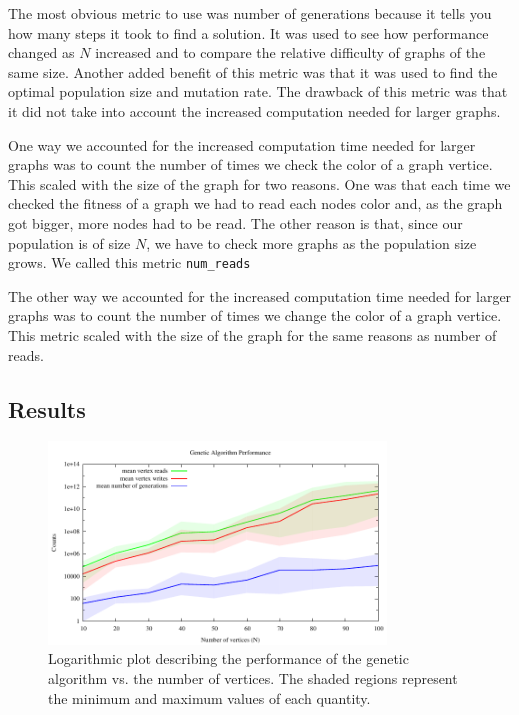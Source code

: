 \documentclass{article}
\begin{document}
	The most obvious metric to use was number of generations because it tells you how many steps it took to find a solution. It was used to see how performance changed as $N$ increased and to compare the relative difficulty of graphs of the same size. Another added benefit of this metric was that it was used to find the optimal population size and mutation rate. The drawback of this metric was that it did not take into account the increased computation needed for larger graphs.
	
	One way we accounted for the increased computation time needed for larger graphs was to count the number of times we check the color of a graph vertice. This scaled with the size of the graph for two reasons. One was that each time we checked the fitness of a graph we had to read each nodes color and, as the graph got bigger, more nodes had to be read. The other reason is that, since our population is of size $N$, we have to check more graphs as the population size grows. We called this metric \texttt{num\_reads}
	
	The other way we accounted for the increased computation time needed for larger graphs was to count the number of times we change the color of a graph vertice. This metric scaled with the size of the graph for the same reasons as number of reads.
	
	\subsection{Results}
	\begin{figure}[h!]
		\centering
		\includegraphics[width=0.80\textwidth]{../results_5/genetic/genetic_performance}
		\caption{Logarithmic plot describing the performance of the genetic algorithm vs. the number of vertices. The shaded regions represent the minimum and maximum values of each quantity.}
		\label{genetic_Performance}
	\end{figure}
	
\end{document}
